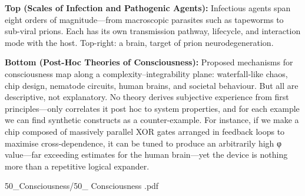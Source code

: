 \begin{SideNotePage}{
  \textbf{Top (Scales of Infection and Pathogenic Agents):}  
  Infectious agents span eight orders of magnitude—from macroscopic parasites such as tapeworms to sub-viral prions. Each has its own transmission pathway, lifecycle, and interaction mode with the host. Top-right: a brain, target of prion neurodegeneration. \par

  \textbf{Bottom (Post-Hoc Theories of Consciousness):}  
  Proposed mechanisms for consciousness map along a complexity–integrability plane: waterfall-like chaos, chip design, nematode circuits, human brains, and societal behaviour. But all are descriptive, not explanatory. No theory derives subjective experience from first principles—only correlates it post hoc to system properties, and for each example we can find synthetic constructs as a counter-example. For instance, if we make a chip composed of massively parallel XOR gates arranged in feedback loops to maximise cross-dependence, it can be tuned to produce an arbitrarily high φ value—far exceeding estimates for the human brain—yet the device is nothing more than a repetitive logical expander. \par
}{50_Consciousness/50_ Consciousness .pdf}
\end{SideNotePage}

